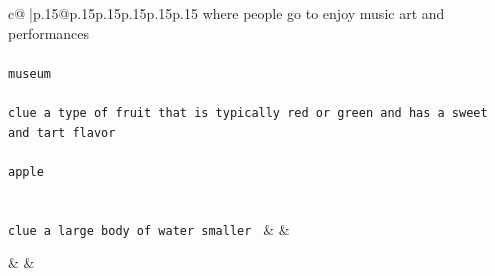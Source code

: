 \documentclass{article}
\begin{document}
{\begin{supertabular}{c@{$\;$}|p{.15\linewidth}@{}p{.15\linewidth}p{.15\linewidth}p{.15\linewidth}p{.15\linewidth}p{.15\linewidth}}
{{{where people go to enjoy music art and performances\\ \tt \\ \tt  museum\\ \tt \\ \tt clue a type of fruit that is typically red or green and has a sweet and tart flavor\\ \tt \\ \tt  apple\\ \tt \\ \tt \\ \tt clue a large body of water smaller 
	  } 
	   } 
	   } 
	 & & \\ 
 

    \theutterance {}  

    & & 
\end{supertabular}}
\end{document}
